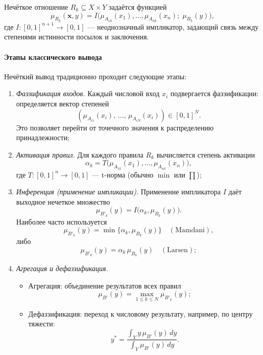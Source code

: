 \begin{definition}
Нечёткое отношение $R_k\subseteq X\times Y$ задаётся функцией
$$
  \mu_{R_k}(\mathbf{x},y)
  = I\bigl(\mu_{A_{1k}}(x_1),\dots,\mu_{A_{nk}}(x_n);\;\mu_{B_k}(y)\bigr),
$$
где $I:[0,1]^{n+1}\to[0,1]$ — неоднозначный импликатор, задающий связь
между степенями истинности посылок и заключения.
\end{definition}

\paragraph{Этапы классического вывода}
Нечёткий вывод традиционно проходит следующие этапы:

\begin{enumerate}
  \item \emph{Фаззификация входов.}
    Каждый числовой вход $x_i$ подвергается фаззификации:
    определяется вектор степеней
    $$
      (\mu_{A_{i1}}(x_i), \,\ldots, \,\mu_{A_{iN}}(x_i))
      \in [0,1]^N.
    $$
    Это позволяет перейти от точечного значения к распределению принадлежности;
  \item \emph{Активация правил.}
    Для каждого правила $R_k$ вычисляется степень активации
    \begin{equation}
      \alpha_k
      = T\bigl(\mu_{A_{1k}}(x_1),\dots,\mu_{A_{nk}}(x_n)\bigr),
      \label{eq:activation}
    \end{equation}
    где $T:[0,1]^n\to[0,1]$ — t-норма (обычно $\min$ или $\prod$);
  \item \emph{Инференция (применение импликации).}
    Применение импликатора $I$ даёт выходное нечеткое множество
    \begin{equation}
      \mu_{B'_k}(y)
      = I\bigl(\alpha_k,\mu_{B_k}(y)\bigr).
      \label{eq:inference}
    \end{equation}
    Наиболее часто используется
    $$
      \mu_{B'_k}(y)=\min\{\alpha_k,\mu_{B_k}(y)\}\quad(\text{Mamdani}),
    $$
    либо
    $$
      \mu_{B'_k}(y)=\alpha_k\,\mu_{B_k}(y)\quad(\text{Larsen});
    $$
  \item \emph{Агрегация и дефаззификация.}
  \begin{itemize}
    \item Агрегация: объединение результатов всех правил
    $$
      \mu_{B'}(y)
      = \max_{1\le k\le N}\mu_{B'_k}(y);
    $$
    \item Дефаззификация: переход к числовому результату,
    например, по центру тяжести:
    \begin{equation}
      y^*
      = \displaystyle\frac{\int_Y y\,\mu_{B'}(y)\,dy}{\int_Y\mu_{B'}(y)\,dy}.
      \label{eq:defuzz_centroid}
    \end{equation}
  \end{itemize}
\end{enumerate}

